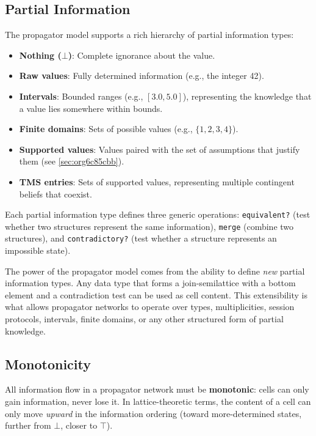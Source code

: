 \documentclass[11pt]{article}
\begin{document}
\subsection{Partial Information}
\label{sec:org05317c2}

The propagator model supports a rich hierarchy of partial information types:

\begin{itemize}
\item \textbf{Nothing (\(\bot\))}: Complete ignorance about the value.
\item \textbf{Raw values}: Fully determined information (e.g., the integer 42).
\item \textbf{Intervals}: Bounded ranges (e.g., \([3.0, 5.0]\)), representing the
knowledge that a value lies somewhere within bounds.
\item \textbf{Finite domains}: Sets of possible values (e.g., \(\{1, 2, 3, 4\}\)).
\item \textbf{Supported values}: Values paired with the set of assumptions that
justify them (see \ref{sec:org6c85cbb}).
\item \textbf{TMS entries}: Sets of supported values, representing multiple
contingent beliefs that coexist.
\end{itemize}

Each partial information type defines three generic operations:
\texttt{equivalent?} (test whether two structures represent the same
information), \texttt{merge} (combine two structures), and \texttt{contradictory?}
(test whether a structure represents an impossible state).

The power of the propagator model comes from the ability to define \emph{new}
partial information types. Any data type that forms a join-semilattice
with a bottom element and a contradiction test can be used as cell
content. This extensibility is what allows propagator networks to
operate over types, multiplicities, session protocols, intervals, finite
domains, or any other structured form of partial knowledge.
\subsection{Monotonicity}
\label{sec:orgd4073be}

All information flow in a propagator network must be \textbf{monotonic}: cells
can only gain information, never lose it. In lattice-theoretic terms,
the content of a cell can only move \emph{upward} in the information ordering
(toward more-determined states, further from \(\bot\), closer to \(\top\)).
\end{document}
